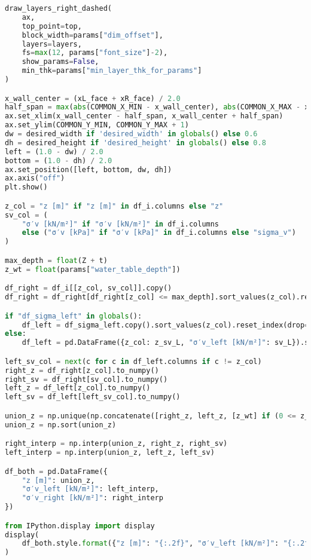 \begin{lstlisting}[language=Python]
draw_layers_right_dashed(
    ax,
    top_point=top,
    block_width=params["dim_offset"],
    layers=layers,
    fs=max(12, params["font_size"]-2),
    show_params=False,
    min_thk=params["min_layer_thk_for_params"]
)

x_wall_center = (xL_face + xR_face) / 2.0
half_span = max(abs(COMMON_X_MIN - x_wall_center), abs(COMMON_X_MAX - x_wall_center))
ax.set_xlim(x_wall_center - half_span, x_wall_center + half_span)
ax.set_ylim(COMMON_Y_MIN, COMMON_Y_MAX + 1)
dw = desired_width if 'desired_width' in globals() else 0.6
dh = desired_height if 'desired_height' in globals() else 0.8
left = (1.0 - dw) / 2.0
bottom = (1.0 - dh) / 2.0
ax.set_position([left, bottom, dw, dh])
ax.axis("off")
plt.show()

z_col = "z [m]" if "z [m]" in df_i.columns else "z"
sv_col = (
    "σ′v [kN/m²]" if "σ′v [kN/m²]" in df_i.columns
    else ("σ′v [kPa]" if "σ′v [kPa]" in df_i.columns else "sigma_v")
)

max_depth = float(Z + t)
z_wt = float(params["water_table_depth"])

df_right = df_i[[z_col, sv_col]].copy()
df_right = df_right[df_right[z_col] <= max_depth].sort_values(z_col).reset_index(drop=True)

if "df_sigma_left" in globals():
    df_left = df_sigma_left.copy().sort_values(z_col).reset_index(drop=True)
else:
    df_left = pd.DataFrame({z_col: z_sv_L, "σ′v_left [kN/m²]": sv_L}).sort_values(z_col).reset_index(drop=True)

left_sv_col = next(c for c in df_left.columns if c != z_col)
right_z = df_right[z_col].to_numpy()
right_sv = df_right[sv_col].to_numpy()
left_z = df_left[z_col].to_numpy()
left_sv = df_left[left_sv_col].to_numpy()

union_z = np.unique(np.concatenate([right_z, left_z, [z_wt] if (0 <= z_wt <= max_depth) else []]))
union_z = np.sort(union_z)

right_interp = np.interp(union_z, right_z, right_sv)
left_interp = np.interp(union_z, left_z, left_sv)

df_both = pd.DataFrame({
    "z [m]": union_z,
    "σ′v_left [kN/m²]": left_interp,
    "σ′v_right [kN/m²]": right_interp
})

from IPython.display import display
display(
    df_both.style.format({"z [m]": "{:.2f}", "σ′v_left [kN/m²]": "{:.2f}", "σ′v_right [kN/m²]": "{:.2f}"})
)
\end{lstlisting}
